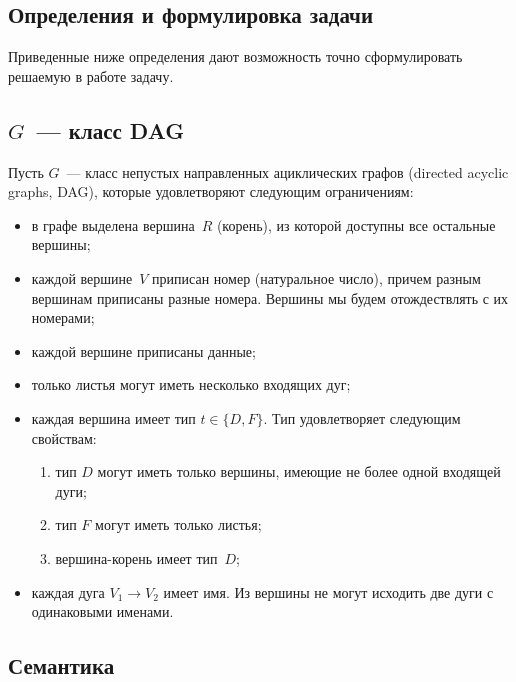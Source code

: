 \begin{multicols}{2}
\section{Определения и формулировка задачи}

\vspace*{-2pt}

      Приведенные ниже определения дают возможность точно 
сформулировать решаемую в работе задачу.

\vspace*{-5pt}

\subsection{$G$~--- класс DAG}

      Пусть $G$~--- класс непустых направленных ацик\-ли\-че\-ских графов 
(directed acyclic graphs, DAG), которые удовлетворяют следующим 
ограничениям:
      \begin{itemize}
\item в графе выделена вершина~$R$ (корень), из которой доступны все 
остальные вершины;
\item каждой вершине~$V$ приписан номер (натуральное число), причем 
разным вершинам приписаны разные номера. Вершины мы будем 
отож\-де\-ст\-влять с их номерами;
\item каждой вершине приписаны данные;
\item только листья могут иметь несколько входящих дуг;
\item каждая вершина имеет тип $t\in \{D, F\}$. Тип удовлетворяет следующим 
свойствам:
\begin{enumerate}[(1)]
\item тип $D$ могут иметь только вершины, име\-ющие не более одной 
входящей дуги;\\[-13pt]
\item тип $F$ могут иметь только листья;\\[-13pt]
\item вершина-корень имеет тип~$D$;\\[-13pt] 
\end{enumerate}
\item каждая дуга $V_1\rightarrow V_2$ имеет имя. Из вершины не могут 
исходить две дуги с одинаковыми именами.
\end{itemize}

\vspace*{-4pt}

\subsection{Семантика}


\end{multicols}

